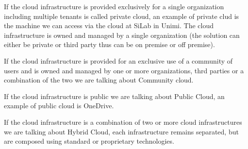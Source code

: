 If the cloud infrastructure is provided exclusively for a single organization including multiple tenants is called private cloud, an example of private clud is the machine we can access via the cloud at SiLab in Unimi. The cloud infrastructure is owned and managed by a single organization (the solution can either be private or third party thus can be on premise or off premise).

If the cloud infrastructure is provided for an exclusive use of a community of users and is owned and managed by one or more organizations, thrd parties or a combination of the two we are talking about Community cloud.

If the cloud infrastructure is public we are talking about Public Cloud, an example of public cloud is OneDrive.

If the cloud infrastructure is a combination of two or more cloud infrastructures we are talking about Hybrid Cloud, each infrastructure remains separated, but are composed using standard or proprietary technologies.
